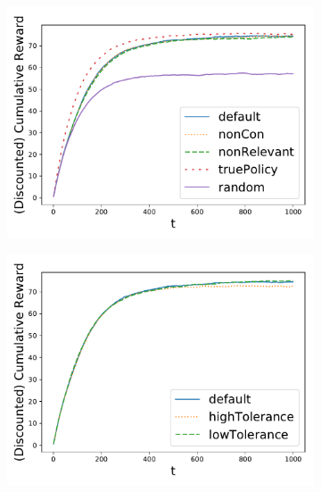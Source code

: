 \documentclass{article}
\begin{document}
		
		\begin{figure}
			\begin{subfigure}{0.333\textwidth}
				\includegraphics[width=\textwidth]{smallDNRewardsConservativity}
				\caption{}
			\end{subfigure}
			\begin{subfigure}{0.333\textwidth}
				\includegraphics[width=\textwidth]{smallDNRewardsTolerance}
				\caption{}
			\end{subfigure}
			\begin{subfigure}{0.333\textwidth}

\end{subfigure}
\end{figure}
\end{document}
